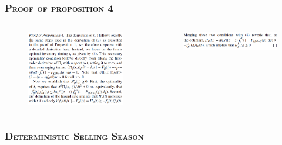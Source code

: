 \documentclass[aspectratio=169]{../presentation}
\begin{document}
    \begin{frame}
        \frametitle{\textsc{Proof of proposition 4}}

        \begin{columns}
            \begin{column}{0.5\linewidth}
                \begin{figure}[h]
                    \includegraphics[width=\linewidth]{imgs/gp01-5.png}
                \end{figure}
            \end{column}
            \begin{column}{0.5\linewidth}
                \begin{figure}[h]
                    \includegraphics[width=\linewidth]{imgs/gp01-6.png}
                \end{figure}
            \end{column}
        \end{columns}

    \end{frame}

    \subsubsection{\textsc{Deterministic Selling Season}}
\end{document}
